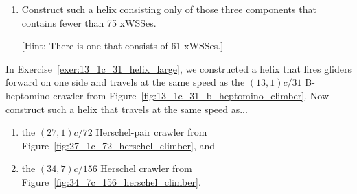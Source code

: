 \begin{multicols}{2}
\begin{problem}
\begin{enumerate}[label=\bf\color{ocre}(\alph*)]
		\item Construct such a helix consisting only of those three components that contains fewer than 75 xWSSes.
		
		[Hint: There is one that consists of $61$ xWSSes.]
	\end{enumerate}
\end{problem}


\mfilbreak


\begin{problem}\label{exer:construct_oblique_helix_for_crawlers}
	In Exercise~\ref{exer:13_1c_31_helix_large}, we constructed a helix that fires gliders forward on one side and travels at the same speed as the $(13,1)c/31$ B-heptomino crawler from Figure~\ref{fig:13_1c_31_b_heptomino_climber}. Now construct such a helix that travels at the same speed as...
	
	\begin{enumerate}[label=\bf\color{ocre}(\alph*)]
		\item the $(27,1)c/72$ Herschel-pair crawler from Figure~\ref{fig:27_1c_72_herschel_climber}, and
		
		\item the $(34,7)c/156$ Herschel crawler from Figure~\ref{fig:34_7c_156_herschel_climber}.
	\end{enumerate}
\end{problem}

\end{multicols}
\normalsize\vspace*{0.01cm}
